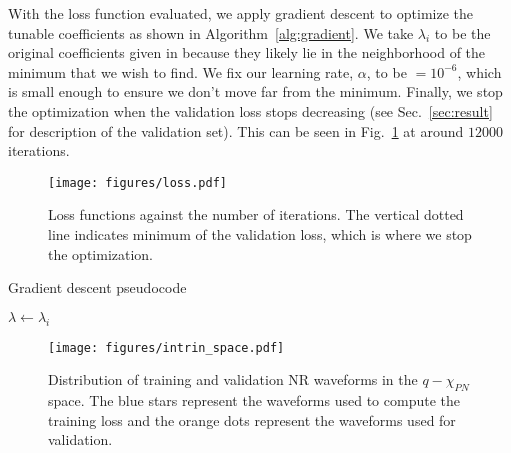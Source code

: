 \documentclass[twocolumn]{aastex631}
\begin{document}
With the loss function evaluated, we apply gradient descent to optimize the tunable
coefficients as shown in Algorithm~\ref{alg:gradient}. We take $\lambda_i$ to be the 
original coefficients given in \citep{khan2016frequency} because they likely lie in the
neighborhood of the minimum that we wish to find. 
We fix our learning rate, $\alpha$, to be $=10^{-6}$, which is small enough to ensure we 
don't move far from the minimum.
Finally, we stop the optimization when the validation loss stops decreasing 
(see Sec.~\ref{sec:result} for description of the validation set).
This can be seen in Fig.~\ref{fig:loss} at around $12000$ iterations.

\begin{figure}
	\centering
	\texttt{[image: figures/loss.pdf]}
	\caption{Loss functions against the number of iterations. The vertical
	dotted line indicates minimum of the validation loss, which is where we stop
	the optimization.}
	\label{fig:loss}
\end{figure}

\begin{algorithm}[t]
	\caption{Gradient descent pseudocode}
	\label{alg:gradient}
	    $\lambda\leftarrow\lambda_i$\\
	 \Return{$\lambda$}
\end{algorithm}

\begin{figure}[t]
	\centering
	\texttt{[image: figures/intrin\_space.pdf]}
	\caption{Distribution of training and validation NR waveforms in the
	$q-\chi_{PN}$ space. The blue stars represent the waveforms used to compute
	the training loss and the orange dots represent the waveforms used for
	validation.}
	\label{fig:intrin_space}
\end{figure}
\end{document}
